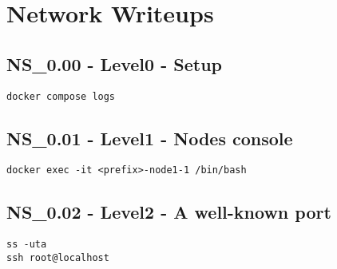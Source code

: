 \chapter{Network Writeups}
\section{NS_0.00 - Level0 - Setup}
\texttt{docker compose logs}

\section{NS_0.01 - Level1 - Nodes console}
\texttt{docker exec -it <prefix>-node1-1 /bin/bash}

\section{NS_0.02 - Level2 - A well-known port}
\begin{verbatim}
ss -uta
ssh root@localhost
\end{verbatim}

